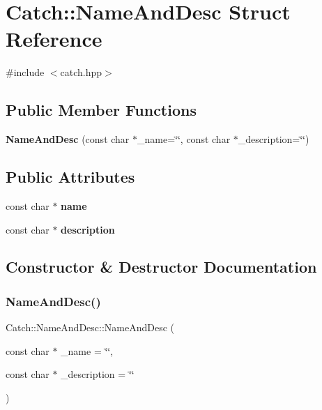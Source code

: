 \section{Catch\+:\+:Name\+And\+Desc Struct Reference}
\label{struct_catch_1_1_name_and_desc}


{\ttfamily \#include $<$catch.\+hpp$>$}

\subsection*{Public Member Functions}
\begin{DoxyCompactItemize}
\item 
\textbf{ Name\+And\+Desc} (const char $\ast$\+\_\+name=\char`\"{}\char`\"{}, const char $\ast$\+\_\+description=\char`\"{}\char`\"{})
\end{DoxyCompactItemize}
\subsection*{Public Attributes}
\begin{DoxyCompactItemize}
\item 
const char $\ast$ \textbf{ name}
\item 
const char $\ast$ \textbf{ description}
\end{DoxyCompactItemize}


\subsection{Constructor \& Destructor Documentation}
\mbox{\label{struct_catch_1_1_name_and_desc_a189ceb9942fb5f6635140d6a09fc843a}} 
\subsubsection{Name\+And\+Desc()}
{\footnotesize\ttfamily Catch\+::\+Name\+And\+Desc\+::\+Name\+And\+Desc (\begin{DoxyParamCaption}\item[{const char $\ast$}]{\+\_\+name = {\ttfamily \char`\"{}\char`\"{}},  }\item[{const char $\ast$}]{\+\_\+description = {\ttfamily \char`\"{}\char`\"{}} }\end{DoxyParamCaption})\hspace{0.3cm}{\ttfamily [inline]}}



